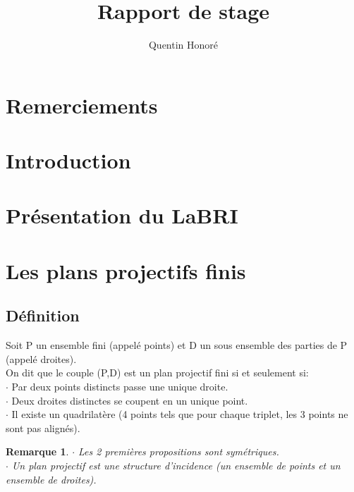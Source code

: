\documentclass[a4paper]{article}
\title{Rapport de stage}
\newtheorem{Rem}{Remarque}[subsection]
\begin{document}
\author{Quentin Honoré}
\date{}
\maketitle
\newpage
\tableofcontents
\newpage
\section*{Remerciements}
\newpage
\section*{Introduction}
\newpage
\section{Présentation du LaBRI}
\newpage
\section{Les plans projectifs finis}
\subsection{Définition}
Soit P un ensemble fini (appelé points) et D un sous ensemble des parties de P (appelé droites). \\
On dit que le couple (P,D) est un plan projectif fini si et seulement si: \\
$\cdot$ Par deux points distincts passe une unique droite. \\
$\cdot$ Deux droites distinctes se coupent en un unique point. \\
$\cdot$ Il existe un quadrilatère (4 points tels que pour chaque triplet, les 3 points ne sont pas alignés).

\begin{Rem}
  $\cdot$ Les 2 premières propositions sont symétriques. \\
  $\cdot$ Un plan projectif est une structure d'incidence (un ensemble de points et un ensemble de droites).
\end{Rem}
  
\end{document}
